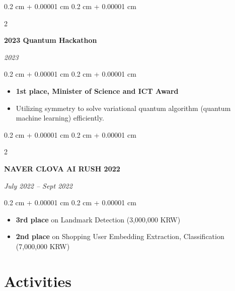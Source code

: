 \documentclass[10pt, letterpaper]{article}
\newenvironment{highlights}{
    \begin{itemize}[
        topsep=0.10 cm,
        parsep=0.10 cm,
        partopsep=0pt,
        itemsep=0pt,
        leftmargin=0.4 cm + 10pt
    ]
}{
    \end{itemize}
} %
\newenvironment{onecolentry}{
    \begin{adjustwidth}{
        0.2 cm + 0.00001 cm
    }{
        0.2 cm + 0.00001 cm
    }
}{
    \end{adjustwidth}
} %
\newenvironment{twocolentry}[2][]{
    \onecolentry
    \def\secondColumn{#2}
    \setcolumnwidth{\fill, 4.5 cm}
    \begin{paracol}{2}
}{
    \switchcolumn \raggedleft \secondColumn
    \end{paracol}
    \endonecolentry
} %
\let\hrefWithoutArrow\href
\renewcommand{\href}[2]{\hrefWithoutArrow{#1}{\ifthenelse{\equal{#2}{}}{ }{#2 }\raisebox{.15ex}{\footnotesize \faExternalLink*}}}
\begin{document}
\begin{twocolentry}{
        \textit{2023}
    }
    \textbf{2023 Quantum Hackathon \href{https://qhackathon.kr/}{[link]}}
\end{twocolentry}

\vspace{0.10 cm}
\begin{onecolentry}
    \begin{highlights}
        \item \textbf{1st place, Minister of Science and ICT Award}
        \item Utilizing symmetry to solve variational quantum algorithm (quantum machine learning) efficiently.
    \end{highlights}
\end{onecolentry}

\vspace{0.2 cm}

\begin{twocolentry}{
        \textit{July 2022 – Sept 2022}
    }
    \textbf{NAVER CLOVA AI RUSH 2022 \href{https://campaign.naver.com/clova_airush/}{[link]}}
\end{twocolentry}

\vspace{0.10 cm}
\begin{onecolentry}
    \begin{highlights}
        \item \textbf{3rd place} on Landmark Detection (3,000,000 KRW)
        \item \textbf{2nd place} on Shopping User Embedding Extraction, Classification (7,000,000 KRW)
    \end{highlights}
\end{onecolentry}

\section{Activities}
\end{document}
